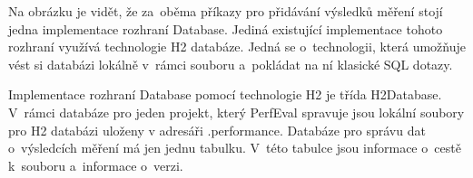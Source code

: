Na obrázku je vidět, že za~oběma příkazy pro přidávání výsledků měření stojí jedna implementace rozhraní Database.
Jediná existující implementace tohoto rozhraní využívá technologie H2 databáze. Jedná se o~technologii, která umožňuje
vést si databázi lokálně v~rámci souboru a~pokládat na ní klasické SQL dotazy.

Implementace rozhraní Database pomocí technologie H2 je třída H2Database. V~rámci databáze pro jeden projekt, který
PerfEval spravuje jsou lokální soubory pro H2 databázi uloženy v adresáři .performance. Databáze pro správu dat o~výsledcích
měření má jen jednu tabulku. V~této tabulce jsou informace o~cestě k~souboru a~informace o~verzi.

